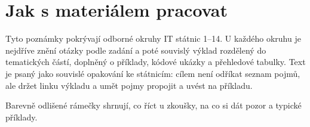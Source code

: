 \section*{Jak s materiálem pracovat}
Tyto poznámky pokrývají odborné okruhy IT státnic 1--14. U každého okruhu je nejdříve znění otázky podle zadání a poté souvislý výklad rozdělený do tematických částí, doplněný o příklady, kódové ukázky a přehledové tabulky. Text je psaný jako souvislé opakování ke státnicím: cílem není odříkat seznam pojmů, ale držet linku výkladu a umět pojmy propojit a uvést na příkladu.

Barevně odlišené rámečky shrnují, co říct u zkoušky, na co si dát pozor a typické příklady.


